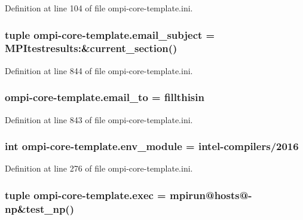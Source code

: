 Definition at line 104 of file ompi-\/core-\/template.\-ini.

\hypertarget{namespaceompi-core-template_ac4f2db43f33456d69bc406e6c49d97ba}{
\subsubsection[{email\-\_\-subject}]{\setlength{\rightskip}{0pt plus 5cm}tuple ompi-\/core-\/template.\-email\-\_\-subject = M\-P\-Itestresults\-:\&current\-\_\-section()}}\label{namespaceompi-core-template_ac4f2db43f33456d69bc406e6c49d97ba}


Definition at line 844 of file ompi-\/core-\/template.\-ini.

\hypertarget{namespaceompi-core-template_aaaab8c1c7d53df0c1adc63e36a2b71ab}{
\subsubsection[{email\-\_\-to}]{\setlength{\rightskip}{0pt plus 5cm}ompi-\/core-\/template.\-email\-\_\-to = fillthisin}}\label{namespaceompi-core-template_aaaab8c1c7d53df0c1adc63e36a2b71ab}


Definition at line 843 of file ompi-\/core-\/template.\-ini.

\hypertarget{namespaceompi-core-template_a3bf425cb265062b8fec8a62d2a1fd8a3}{
\subsubsection[{env\-\_\-module}]{\setlength{\rightskip}{0pt plus 5cm}int ompi-\/core-\/template.\-env\-\_\-module = intel-\/compilers/2016}}\label{namespaceompi-core-template_a3bf425cb265062b8fec8a62d2a1fd8a3}


Definition at line 276 of file ompi-\/core-\/template.\-ini.

\hypertarget{namespaceompi-core-template_a053976d8fb6135592c6990fd3f75537a}{
\subsubsection[{exec}]{\setlength{\rightskip}{0pt plus 5cm}tuple ompi-\/core-\/template.\-exec = mpirun@{\bf hosts}@-\/{\bf np}\&test\-\_\-np()}}\label{namespaceompi-core-template_a053976d8fb6135592c6990fd3f75537a}


